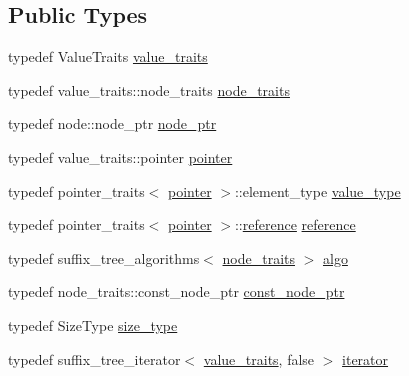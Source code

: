 \subsection*{Public Types}
\begin{DoxyCompactItemize}
\item 
typedef Value\+Traits \hyperlink{classboost_1_1intrusive_1_1suffix__tree__impl_a30d9e164c38c11cd38917ad14e9f3e88}{value\+\_\+traits}
\item 
typedef value\+\_\+traits\+::node\+\_\+traits \hyperlink{classboost_1_1intrusive_1_1suffix__tree__impl_a4fac695b2c8ea16789711a9840af44c4}{node\+\_\+traits}
\item 
typedef node\+::node\+\_\+ptr \hyperlink{classboost_1_1intrusive_1_1suffix__tree__impl_a055e19a35a8268047cec3a6e9341dfca}{node\+\_\+ptr}
\item 
typedef value\+\_\+traits\+::pointer \hyperlink{classboost_1_1intrusive_1_1suffix__tree__impl_af8ad26e95f6cc7ba4a814d02eb8f4320}{pointer}
\item 
typedef pointer\+\_\+traits$<$ \hyperlink{classboost_1_1intrusive_1_1suffix__tree__impl_af8ad26e95f6cc7ba4a814d02eb8f4320}{pointer} $>$\+::element\+\_\+type \hyperlink{classboost_1_1intrusive_1_1suffix__tree__impl_a592893260249dc653dfe9f36ea5d14b6}{value\+\_\+type}
\item 
typedef pointer\+\_\+traits$<$ \hyperlink{classboost_1_1intrusive_1_1suffix__tree__impl_af8ad26e95f6cc7ba4a814d02eb8f4320}{pointer} $>$\+::\hyperlink{classboost_1_1intrusive_1_1suffix__tree__impl_af66898eb8c69a952f6a92f6c6b704bed}{reference} \hyperlink{classboost_1_1intrusive_1_1suffix__tree__impl_af66898eb8c69a952f6a92f6c6b704bed}{reference}
\item 
typedef suffix\+\_\+tree\+\_\+algorithms$<$ \hyperlink{classboost_1_1intrusive_1_1suffix__tree__impl_a4fac695b2c8ea16789711a9840af44c4}{node\+\_\+traits} $>$ \hyperlink{classboost_1_1intrusive_1_1suffix__tree__impl_a3e079dda4e4422ad9c911470f3e8c7e2}{algo}
\item 
typedef node\+\_\+traits\+::const\+\_\+node\+\_\+ptr \hyperlink{classboost_1_1intrusive_1_1suffix__tree__impl_a5cf354495727a0b22948de4115d0a2b8}{const\+\_\+node\+\_\+ptr}
\item 
typedef Size\+Type \hyperlink{classboost_1_1intrusive_1_1suffix__tree__impl_ad98ea23cb22b9adc18366b5d8ab56d9b}{size\+\_\+type}
\item 
typedef suffix\+\_\+tree\+\_\+iterator$<$ \hyperlink{classboost_1_1intrusive_1_1suffix__tree__impl_a30d9e164c38c11cd38917ad14e9f3e88}{value\+\_\+traits}, false $>$ \hyperlink{classboost_1_1intrusive_1_1suffix__tree__impl_a2df3b52dced59346b59db470e93ba87c}{iterator}

\end{DoxyCompactItemize}
